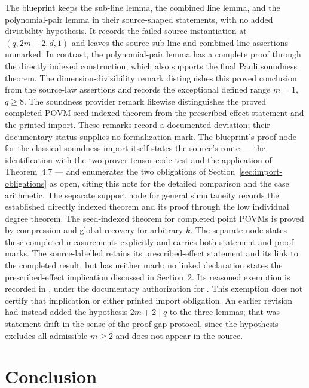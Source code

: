 \documentclass[11pt]{article}
\begin{document}
The blueprint \cite{MIPStarREBlueprint} keeps the sub-line lemma, the
combined line lemma, and the polynomial-pair lemma in their source-shaped
statements, with no added divisibility hypothesis. It records the failed
source instantiation at $(q,2m+2,d,1)$ and leaves the source sub-line and
combined-line assertions unmarked. In contrast, the polynomial-pair lemma
has a complete proof through the directly indexed construction, which also
supports the final Pauli soundness theorem. The dimension-divisibility
remark distinguishes this proved conclusion from the source-law assertions
and records the exceptional defined range $m=1$, $q\ge8$. The soundness
provider remark likewise distinguishes the proved completed-POVM
seed-indexed theorem from the prescribed-effect statement and the printed
import. These remarks record a documented deviation;
their documentary status supplies no formalization mark.
The blueprint's proof node
for the classical soundness import itself states the source's route --- the
identification with the two-prover tensor-code test and the application of
Theorem~4.7 --- and enumerates the two obligations of
Section~\ref{sec:import-obligations} as open, citing this note for the
detailed comparison and the case arithmetic.  The separate support node for
general simultaneity records the established directly indexed theorem and its
proof through the low individual degree theorem. The seed-indexed theorem
for completed point POVMs is proved by compression and global recovery for
arbitrary $k$. The separate node 
states these completed measurements explicitly and carries both statement
and proof marks. The source-labelled  retains its
prescribed-effect statement and its link to the completed result, but has
neither mark: no linked declaration states the prescribed-effect implication
discussed in Section~2. Its reasoned exemption is recorded in
, under the documentary
authorization for . This exemption does not certify that
implication or either printed import obligation.
An earlier revision had
instead added the hypothesis $2m+2 \mid q$ to the three lemmas; that was
statement drift in the sense of the proof-gap protocol, since the hypothesis
excludes all admissible $m \ge 2$ and does not appear in the source.

\section{Conclusion}
\end{document}
